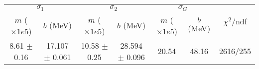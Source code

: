\begin{tabular}{cc|cc|cc||c}
\multicolumn{2}{c|}{$\sigma_1$} & \multicolumn{2}{|c}{$\sigma_2$} & \multicolumn{2}{|c}{$\sigma_G$}  & \multirow{2}{*}{$\chi^2/$ndf}\\
$m$ ($\times1e5$) & $b$ (MeV) & $m$ ($\times1e5$) & $b$ (MeV) & $m$ ($\times1e5$) & $b$ (MeV) & \\
\hline
8.61 $\pm$ 0.16 & 17.107 $\pm$ 0.061 & 10.58 $\pm$ 0.25 & 28.594 $\pm$ 0.096 & 20.54 & 48.16 & 2616/255\\
\end{tabular}
